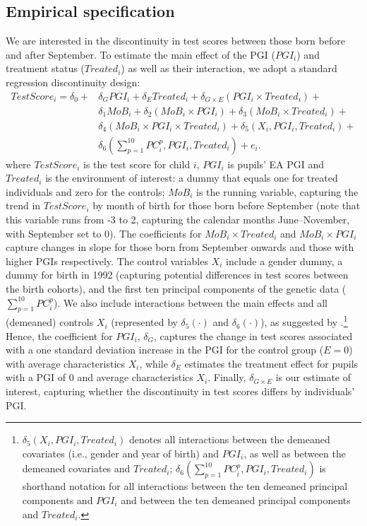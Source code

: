 \documentclass[12pt,a4paper]{article}
\begin{document}
\begin{bibunit}
\subsection{Empirical specification} \label{sec:analysis}
We are interested in the discontinuity in test scores between those born before and after September. To estimate the main effect of the PGI ($PGI_i$) and treatment status ($Treated_i$) as well as their interaction, we adopt a standard regression discontinuity design:
\begin{equation}\label{eq:GxE}
\begin{aligned}
        TestScore_i = \delta_0 + & \delta_{G} PGI_i + \delta_{E} Treated_i + \delta_{G \times E} (PGI_i \times Treated_i) + \\ 
        & \delta_1 MoB_i + \delta_2 (MoB_i \times PGI_i) + \delta_3 (MoB_i \times Treated_i) + \\ 
        & \delta_4 (MoB_i \times PGI_i \times Treated_i) + \delta_5\left(X_i,PGI_i,Treated_i\right) + \\
        & \delta_6\left(\sum_{p=1}^{10} PC^p_i,PGI_i,Treated_i\right) + e_i.
\end{aligned}
\end{equation}
where $TestScore_i$ is the test score for child $i$, $PGI_i$ is pupils' EA PGI and $Treated_i$ is the environment of interest: a dummy that equals one for treated individuals and zero for the controls; $MoB_i$ is the running variable, capturing the trend in $TestScore_i$ by month of birth for those born before September (note that this variable runs from -3 to 2, capturing the calendar months June--November, with September set to 0). The coefficients for $MoB_i \times Treated_i $ and $MoB_i \times PGI_i$ capture changes in slope for those born from September onwards and those with higher PGIs respectively. The control variables $X_i$ include a gender dummy, a dummy for birth in 1992 (capturing potential differences in test scores between the birth cohorts), and the first ten principal components of the genetic data ($\sum_{p=1}^{10}PC^p_i$). We also include interactions between the main effects and all (demeaned) controls $X_i$ (represented by $\delta_5(\cdot)$ and $\delta_6(\cdot)$), as suggested by \cite{Keller2014,feigenberg2023omitted}.\footnote{$\delta_5\left(X_i,PGI_i,Treated_i\right)$ denotes all interactions between the demeaned covariates (i.e., gender and year of birth) and $PGI_i$, as well as between the demeaned covariates and $Treated_i$; $\delta_6\left(\sum_{p=1}^{10} PC^p_i,PGI_i,Treated_i\right)$ is shorthand notation for all interactions between the ten demeaned principal components and $PGI_i$ and between the ten demeaned principal components and $Treated_i$.} Hence, the coefficient for $PGI_i$, $\delta_G$, captures the change in test scores associated with a one standard deviation increase in the PGI for the control group ($E=0$) with average characteristics $X_i$, while $\delta_E$ estimates the treatment effect for pupils with a PGI of 0 and average characteristics $X_i$. Finally, $\delta_{G \times E}$ is our estimate of interest, capturing whether the discontinuity in test scores differs by individuals' PGI. 


\end{bibunit}
\end{document}
